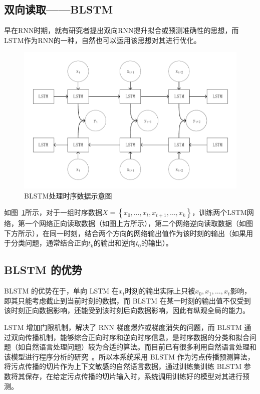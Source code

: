\subsection{双向读取——BLSTM}
早在RNN时期，就有研究者提出双向RNN提升拟合或预测准确性的思想，而LSTM作为RNN的一种，自然也可以运用该思想对其进行优化。

\begin{figure}[htb]
	\centering
	\includegraphics[width=0.8\linewidth]{FIGs/chapter2/blstm.pdf}
	\caption{BLSTM处理时序数据示意图}\label{blstm}
\end{figure}
如图~\ref{blstm}所示，对于一组时序数据$X=\left\{ x_0,\dots,x_t,x_{t+1},\dots,x_{k} \right\}$，训练两个LSTM网络，第一个网络正向读取数据（如图上方所示），第二个网络逆向读取数据（如图下方所示），在同一时刻，结合两个方向的网络输出值作为该时刻的输出（如果用于分类问题，通常结合正向$t_k$的输出和逆向$t_0$的输出）。


\subsection{BLSTM 的优势}

BLSTM 的优势在于，单向 LSTM 在$x_t$时刻的输出实际上只被$x_0, x_1, \dots, x_t$影响，即其只能考虑截止到当前时刻的数据，而 BLSTM 在某一时刻的输出值不仅受到该时刻正向数据影响，还能受到该时刻后向数据影响，因此有纵观全局的能力。

LSTM 增加门限机制，解决了 RNN 梯度爆炸或梯度消失的问题，而 BLSTM 通过双向传播机制，能够综合正向时序和逆向时序信息，是时序数据的分类和拟合问题（如自然语言处理问题）较为合适的算法。而目前已有很多利用自然语言处理和该模型进行程序分析的研究~\cite{naturalSoftware,lstm:recognize,lstm:repo,vuldeepecker,Koc2017,Koc2019}。所以本系统采用 BLSTM 作为污点传播预测算法，将污点传播的切片作为上下文敏感的自然语言数据，通过训练集训练 BLSTM 参数将其保存，在给定污点传播的切片输入时，系统调用训练好的模型对其进行预测。

